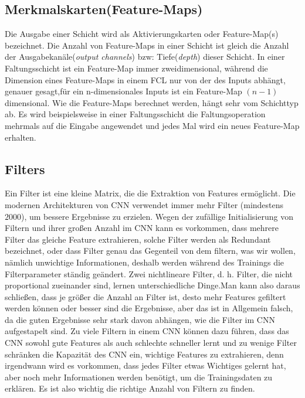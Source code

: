 \documentclass[12pt,a4paper]{scrartcl}
\numberwithin{equation}{section}
\begin{document}
\subsection{Merkmalskarten(Feature-Maps)}
Die Ausgabe einer Schicht wird als Aktivierungskarten oder Feature-Map(s) bezeichnet. Die Anzahl von Feature-Maps in einer Schicht ist gleich die Anzahl der Ausgabekanäle(\textit{output channels}) bzw: Tiefe(\textit{depth}) dieser Schicht.
In einer Faltungsschicht ist ein Feature-Map immer zweidimensional, während die Dimension eines Feature-Maps in einem \ac{FCL} nur von der des Inputs abhängt, genauer gesagt,für ein n-dimensionales Inputs ist ein Feature-Map $ (n-1) $dimensional.
Wie die Feature-Maps berechnet werden, hängt sehr vom Schichttyp ab. Es wird beispielsweise in einer Faltungsschicht die Faltungsoperation mehrmals auf die Eingabe angewendet und jedes Mal wird ein neues Feature-Map erhalten.

\subsection{Filters}\label{Filter}
Ein Filter ist eine kleine Matrix, die die Extraktion von Features ermöglicht.
Die modernen Architekturen von \ac{CNN} verwendet immer mehr Filter (mindestens $ 2000 $), um bessere Ergebnisse zu erzielen. Wegen der zufällige Initialisierung von Filtern und ihrer großen Anzahl im \ac{CNN} kann es vorkommen, dass mehrere Filter das gleiche Feature extrahieren, solche Filter werden als Redundant bezeichnet, oder dass Filter genau das Gegenteil von dem filtern, was wir wollen, nämlich unwichtige Informationen, deshalb werden während des Trainings die Filterparameter ständig geändert. Zwei nichtlineare Filter, d. h. Filter, die nicht proportional zueinander sind, lernen unterschiedliche Dinge.Man kann also daraus schließen, dass je größer die Anzahl an Filter ist, desto mehr Features gefiltert werden können oder besser sind die Ergebnisse, aber das ist in Allgemein falsch, da die guten Ergebnisse sehr stark davon abhängen, wie die Filter im CNN aufgestapelt sind. Zu viele Filtern in einem \ac{CNN} können dazu führen, dass das \ac{CNN} sowohl gute Features als auch schlechte schneller lernt und zu wenige Filter schränken die Kapazität des \ac{CNN} ein,  wichtige Features zu extrahieren, denn irgendwann wird es vorkommen, dass jedes Filter etwas Wichtiges gelernt hat, aber noch mehr Informationen werden benötigt, um die Trainingsdaten zu erklären.
Es ist also wichtig die richtige Anzahl von Filtern zu finden.
\end{document}
